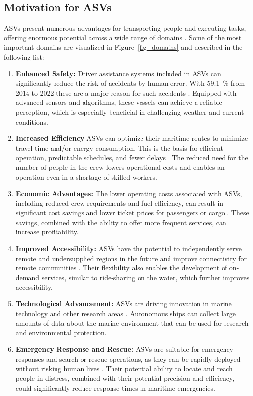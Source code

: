 \subsection{Motivation for ASVs}
ASVs present numerous advantages for transporting people and executing tasks, offering enormous potential across a wide range of domains \cite{Gu.2021}. Some of the most important domains are visualized in Figure~\ref{fig_domains} and described in the following list:
\begin{enumerate}
    \item \textbf{Enhanced Safety:}
    Driver assistance systems included in ASVs can significantly reduce the risk of accidents by human error. With 59.1~\% from 2014 to 2022 these are a major reason for such accidents \citep{EMSA.2023}. Equipped with advanced sensors and algorithms, these vessels can achieve a reliable perception, which is especially beneficial in challenging weather and current conditions.
    \item \textbf{Increased Efficiency}
    ASVs can optimize their maritime routes to minimize travel time and/or energy consumption. This is the basis for efficient operation, predictable schedules, and fewer delays \citep{Barreiro.2022}. The reduced need for the number of people in the crew lowers operational costs and enables an operation even in a shortage of skilled workers.
    \item \textbf{Economic Advantages:}
     The lower operating costs associated with ASVs, including reduced crew requirements and fuel efficiency, can result in significant cost savings and lower ticket prices for passengers or cargo \citep{Gu.2021}. These savings, combined with the ability to offer more frequent services, can increase profitability.
    \item \textbf{Improved Accessibility:}
    ASVs have the potential to independently serve remote and undersupplied regions in the future and improve connectivity for remote communities \citep{Laird.2012}. Their flexibility also enables the development of on-demand services, similar to ride-sharing on the water, which further improves accessibility.
    \item \textbf{Technological Advancement:}
     ASVs are driving innovation in marine technology and other research areas \citep{Rethfeldt.2021}. Autonomous ships can collect large amounts of data about the marine environment that can be used for research and environmental protection. 
    \item \textbf{Emergency Response and Rescue:}
   ASVs are suitable for emergency responses and search or rescue operations,  as they can be rapidly deployed without risking human lives \citep{Mansor.2021}. Their potential ability to locate and reach people in distress, combined with their potential precision and efficiency, could significantly reduce response times in maritime emergencies.
\end{enumerate}
